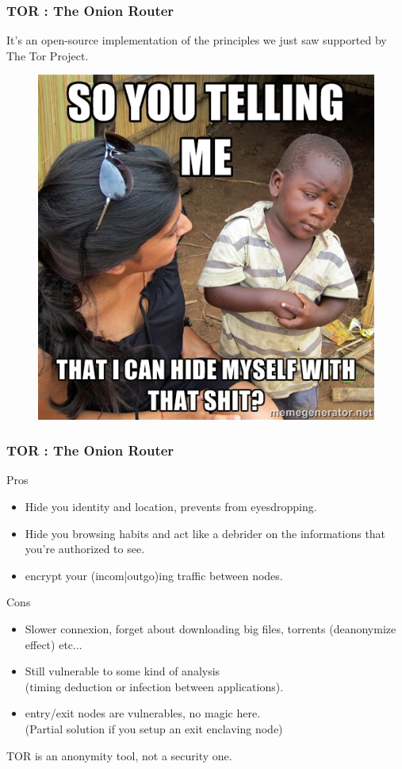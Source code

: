 \begin{frame}
\frametitle{TOR : The Onion Router}
It's an open-source implementation of the principles we just saw supported by
The Tor Project.
\begin{figure}
\includegraphics[width=0.5\linewidth]{./materials/septical_boy}
\end{figure}
\end{frame}
\begin{frame}
\frametitle{TOR : The Onion Router}
\begin{block}{Pros}
\begin{itemize}
\item Hide you identity and location, prevents from eyesdropping.
\item Hide you browsing habits and act like a debrider on the informations that
you're authorized to see.
\item encrypt your (incom|outgo)ing traffic between nodes.
\end{itemize}
\end{block}
\begin{block}{Cons}
\begin{itemize}
\item Slower connexion, forget about downloading big files, torrents
(deanonymize effect) etc...
\item Still vulnerable to some kind of analysis
\\ (timing deduction or infection between applications).
\item entry/exit nodes are vulnerables, no magic here.
\\ (Partial solution if you setup an exit enclaving node)
\end{itemize}
\end{block}
TOR is an anonymity tool, not a security one.
\end{frame}

